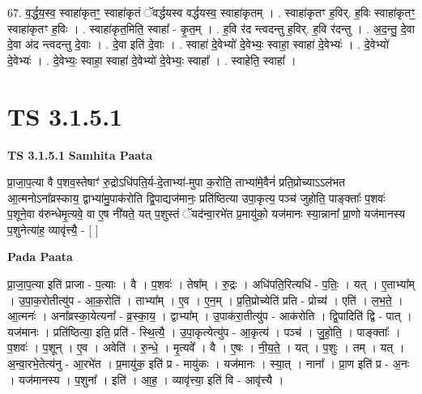 \documentclass[17pt]{extarticle}
\begin{document}
67. व॒र्द्ध॒य॒स्व॒ स्वाहा॑कृतꣳ॒॒ स्वाहा॑कृतं ॅवर्द्धयस्व वर्द्धयस्व॒ स्वाहा॑कृतम् । . स्वाहा॑कृतꣳ ह॒विर्. ह॒विः स्वाहा॑कृतꣳ॒॒ स्वाहा॑कृतꣳ ह॒विः । . स्वाहा॑कृत॒मिति॒ स्वाहा᳚ - कृ॒त॒म् । . ह॒वि र॑द न्त्वदन्तु ह॒विर्. ह॒वि र॑दन्तु । . अ॒द॒न्तु॒ दे॒वा दे॒वा अ॑द न्त्वदन्तु दे॒वाः । . दे॒वा इति॑ दे॒वाः । . स्वाहा॑ दे॒वेभ्यो॑ दे॒वेभ्यः॒ स्वाहा॒ स्वाहा॑ दे॒वेभ्यः॑ । . दे॒वेभ्यो॑ दे॒वेभ्यः॑ । . दे॒वेभ्यः॒ स्वाहा॒ स्वाहा॑ दे॒वेभ्यो॑ दे॒वेभ्यः॒ स्वाहा᳚ । . स्वाहेति॒ स्वाहा᳚ । \newline
\pagebreak
{}

\section{ TS 3.1.5.1 }

\textbf{TS 3.1.5.1 } \newline
\textbf{Samhita Paata} \newline

प्रा॒जा॒प॒त्या वै प॒शव॒स्तेषाꣳ॑ रु॒द्रोऽधि॑पति॒र्य-दे॒ताभ्या॑-मुपा क॒रोति॒ ताभ्या॑मे॒वैनं॑ प्रति॒प्रोच्याऽऽल॑भत आ॒त्मनोऽना᳚व्रस्काय॒ द्वाभ्या॑मु॒पाक॑रोति द्वि॒पाद्यज॑मानः॒ प्रति॑ष्ठित्या उपा॒कृत्य॒ पञ्च॑ जुहोति॒ पाङ्क्ताः᳚ प॒शवः॑ प॒शूने॒वा व॑रुन्धेमृ॒त्यवे॒ वा ए॒ष नी॑यते॒ यत् प॒शुस्तं ॅयद॑न्वा॒रभे॑त प्र॒मायु॑को॒ यज॑मानः स्या॒न्नाना᳚ प्रा॒णो यज॑मानस्य प॒शुनेत्या॑ह॒ व्यावृ॑त्त्यै॒ - [  ] \newline

\textbf{Pada Paata} \newline

प्रा॒जा॒प॒त्या इति॑ प्राजा - प॒त्याः । वै । प॒शवः॑ । तेषा᳚म् । रु॒द्रः । अधि॑पति॒रित्यधि॑ - प॒तिः॒ । यत् । ए॒ताभ्या᳚म् । उ॒पा॒क॒रोतीत्यु॑प - आ॒क॒रोति॑ । ताभ्या᳚म् । ए॒व । ए॒न॒म् । प्र॒ति॒प्रोच्येति॑ प्रति - प्रोच्य॑ । एति॑ । ल॒भ॒ते॒ । आ॒त्मनः॑ । अना᳚व्रस्का॒येत्यना᳚ - व्र॒स्का॒य॒ । द्वाभ्या᳚म् । उ॒पाक॑रा॒तीत्यु॑प - आक॑रोति । द्वि॒पादिति॑ द्वि - पात् । यज॑मानः । प्रति॑ष्ठित्या॒ इति॒ प्रति॑ - स्थि॒त्यै॒ । उ॒पा॒कृत्येत्यु॑प - आ॒कृत्य॑ । पञ्च॑ । जु॒हो॒ति॒ । पाङ्क्ताः᳚ । प॒शवः॑ । प॒शून् । ए॒व । अवेति॑ । रु॒न्धे॒ । मृ॒त्यवे᳚ । वै । ए॒षः । नी॒य॒ते॒ । यत् । प॒शुः । तम् । यत् । अ॒न्वा॒रभे॒तेत्य॑नु - आ॒रभे॑त । प्र॒मायु॑क॒ इति॑ प्र - मायु॑कः । यज॑मानः । स्या॒त् । नाना᳚ । प्रा॒ण इति॑ प्र - अ॒नः । यज॑मानस्य । प॒शुना᳚ । इति॑ । आ॒ह॒ । व्यावृ॑त्त्या॒ इति॑ वि - आवृ॑त्त्यै ।  \newline
\end{document}
